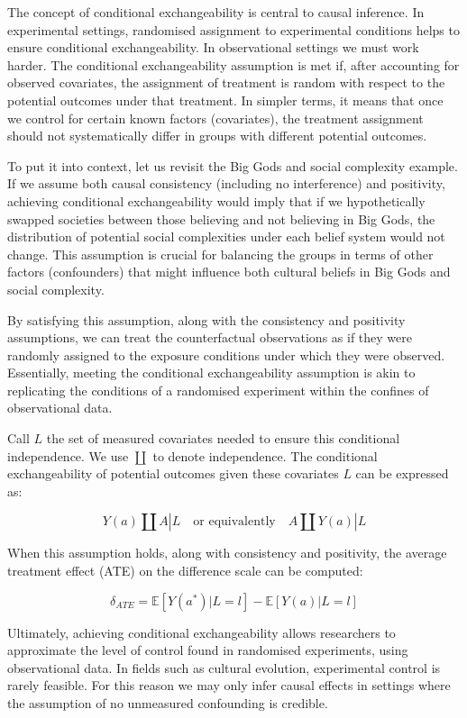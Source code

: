 \documentclass[
  singlecolumn,
  9pt]{article}
\begin{document}
The concept of conditional exchangeability is central to causal
inference. In experimental settings, randomised assignment to
experimental conditions helps to ensure conditional exchangeability. In
observational settings we must work harder. The conditional
exchangeability assumption is met if, after accounting for observed
covariates, the assignment of treatment is random with respect to the
potential outcomes under that treatment. In simpler terms, it means that
once we control for certain known factors (covariates), the treatment
assignment should not systematically differ in groups with different
potential outcomes.

To put it into context, let us revisit the Big Gods and social
complexity example. If we assume both causal consistency (including no
interference) and positivity, achieving conditional exchangeability
would imply that if we hypothetically swapped societies between those
believing and not believing in Big Gods, the distribution of potential
social complexities under each belief system would not change. This
assumption is crucial for balancing the groups in terms of other factors
(confounders) that might influence both cultural beliefs in Big Gods and
social complexity.

By satisfying this assumption, along with the consistency and positivity
assumptions, we can treat the counterfactual observations as if they
were randomly assigned to the exposure conditions under which they were
observed. Essentially, meeting the conditional exchangeability
assumption is akin to replicating the conditions of a randomised
experiment within the confines of observational data.

Call \(L\) the set of measured covariates needed to ensure this
conditional independence. We use \(\coprod\) to denote independence. The
conditional exchangeability of potential outcomes given these covariates
\(L\) can be expressed as:

\[
Y(a) \coprod  A|L \quad \text{or equivalently} \quad A \coprod  Y(a)|L
\]

When this assumption holds, along with consistency and positivity, the
average treatment effect (ATE) on the difference scale can be computed:

\[
\delta_{ATE}  = \mathbb{E}[Y(a^*)|L = l] - \mathbb{E}[Y(a)|L = l]
\]

Ultimately, achieving conditional exchangeability allows researchers to
approximate the level of control found in randomised experiments, using
observational data. In fields such as cultural evolution, experimental
control is rarely feasible. For this reason we may only infer causal
effects in settings where the assumption of no unmeasured confounding is
credible.
\end{document}
